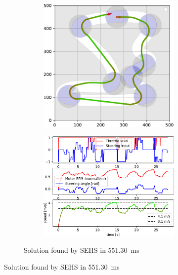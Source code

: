 \begin{figure}[!tbp]
	\vspace{0.75cm}
	
	\begin{subfigure}[t]{\textwidth}
		\begin{subfigure}[c]{0.49\textwidth}
			\includegraphics[width=\textwidth]{../img/experiments/tornado_sehs_trajectory}
		\end{subfigure}
		\hfill
		\begin{subfigure}[c]{0.49\textwidth}
			\includegraphics[width=\textwidth]{../img/experiments/tornado_sehs_actuators}
		\end{subfigure}
		\caption{Solution found by SEHS in \SI{551.30}{\milli\second}}
		\label{fig:solution_tornado-sehs}
	\end{subfigure}
	

\end{figure}
